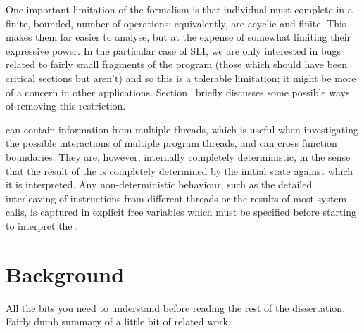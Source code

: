 One important limitation of the \StateMachine formalism is that individual \StateMachines must complete in a finite, bounded, number of operations; equivalently, \StateMachines are acyclic and finite.
This makes them far easier to analyse, but at the expense of somewhat limiting their expressive power.
In the particular case of SLI, we are only interested in bugs related to fairly small fragments of the program (those which should have been critical sections but aren't) and so this is a tolerable limitation; it might be more of a concern in other applications.
Section~ briefly discusses some possible ways of removing this restriction.

\StateMachines can contain information from multiple threads, which is useful when investigating the possible interactions of multiple program threads, and can cross function boundaries.
They are, however, internally completely deterministic, in the sense that the result of the \StateMachine is completely determined by the initial state against which it is interpreted.
Any non-deterministic behaviour, such as the detailed interleaving of instructions from different threads or the results of most system calls, is captured in explicit free variables which must be specified before starting to interpret the \StateMachine.


\section{Background}
All the bits you need to understand before reading the rest of the dissertation.
Fairly dumb summary of a little bit of related work.
